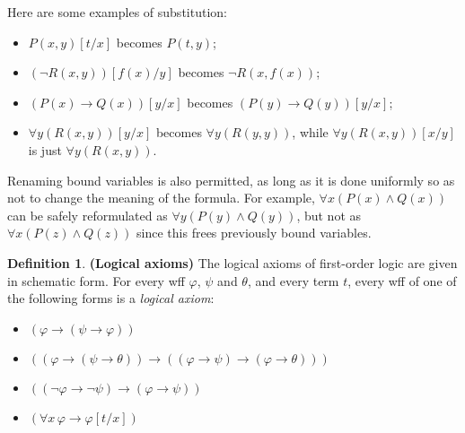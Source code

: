 \documentclass[10pt, a4paper, oneside]{article}
\theoremstyle{definition}
\newtheorem{dfn}[thm]{Definition}
\theoremstyle{remark}
\theoremstyle{plain}
\begin{document}
Here are some examples of substitution:

\begin{itemize}
    \item $P(x, y)[t / x]$ becomes $P(t, y)$;
    \item $(\neg R(x, y))[f(x) / y]$ becomes $\neg R(x, f(x))$;
    \item $(P(x) \rightarrow Q(x)) [y / x]$ becomes
        $(P(y) \rightarrow Q(y)) [y / x]$;
    \item $\forall{y} (R(x, y)) [y / x]$ becomes $\forall{y} (R(y, y))$, while
        $\forall{y} (R(x, y)) [x / y]$ is just $\forall{y} (R(x, y))$.
\end{itemize}

Renaming bound variables is also permitted, as long as it is done uniformly so
as not to change the meaning of the formula. For example, $\forall{x} (P(x)
\wedge Q(x))$ can be safely reformulated as $\forall{y} (P(y) \wedge Q(y))$, but
not as $\forall{x} (P(z) \wedge Q(z))$ since this frees previously bound
variables.

\begin{dfn}
    \textbf{(Logical axioms)}
    The logical axioms of first-order logic are given in schematic form. For
    every wff $\varphi$, $\psi$ and $\theta$, and every term $t$, every wff of
    one of the following forms is a \emph{logical axiom}:
    
    \begin{itemize}
        \item $(\varphi \rightarrow (\psi \rightarrow \varphi))$
        \item $( (\varphi \rightarrow (\psi \rightarrow \theta))
              \rightarrow
              ( (\varphi \rightarrow \psi)
                \rightarrow
                (\varphi \rightarrow \theta) ) )$
        \item $( (\neg\varphi \rightarrow \neg\psi)
                 \rightarrow
                 (\varphi \rightarrow \psi) )$
        \item $(\forall{x} \, \varphi \rightarrow \varphi[t / x])$
    \end{itemize}
\end{dfn}
\end{document}
